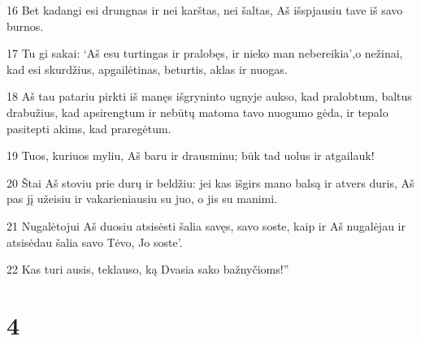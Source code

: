 \par 16 Bet kadangi esi drungnas ir nei karštas, nei šaltas, Aš išspjausiu tave iš savo burnos. 
\par 17 Tu gi sakai: ‘Aš esu turtingas ir pralobęs, ir nieko man nebereikia’,­o nežinai, kad esi skurdžius, apgailėtinas, beturtis, aklas ir nuogas. 
\par 18 Aš tau patariu pirkti iš manęs išgryninto ugnyje aukso, kad pralobtum, baltus drabužius, kad apsirengtum ir nebūtų matoma tavo nuogumo gėda, ir tepalo pasitepti akims, kad praregėtum. 
\par 19 Tuos, kuriuos myliu, Aš baru ir drausminu; būk tad uolus ir atgailauk! 
\par 20 Štai Aš stoviu prie durų ir beldžiu: jei kas išgirs mano balsą ir atvers duris, Aš pas jį užeisiu ir vakarieniausiu su juo, o jis su manimi. 
\par 21 Nugalėtojui Aš duosiu atsisėsti šalia savęs, savo soste, kaip ir Aš nugalėjau ir atsisėdau šalia savo Tėvo, Jo soste’. 
\par 22 Kas turi ausis, teklauso, ką Dvasia sako bažnyčioms!”


\chapter{4}


